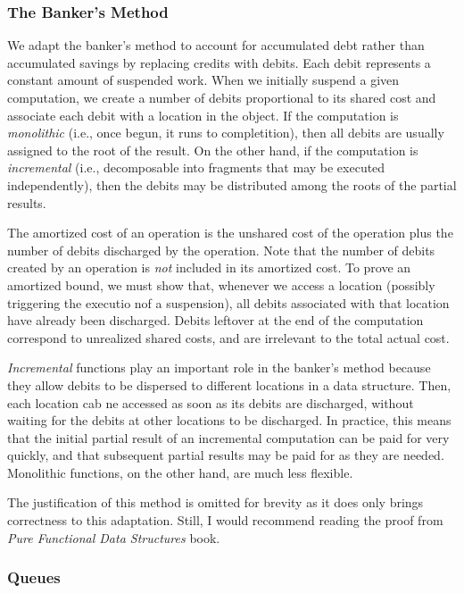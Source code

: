 \documentclass[12pt, a4paper]{article} %
\begin{document}
\subsubsection{The Banker's Method}%
\label{ssub:The Banker's Method}

We adapt the banker's method to account for accumulated debt rather than accumulated savings by replacing credits with debits. Each debit represents a constant amount of suspended work. When we initially suspend a given computation, we create a number of debits proportional to its shared cost and associate each debit with a location in the object. If the computation is \textit{monolithic} (i.e., once begun, it runs to completition), then all debits are usually assigned to the root of the result. On the other hand, if the computation is \textit{incremental} (i.e., decomposable into fragments that may be executed independently), then the debits may be distributed among the roots of the partial results.

The amortized cost of an operation is the unshared cost of the operation plus the number of debits discharged by the operation. Note that the number of debits created by an operation is \textit{not} included in its amortized cost. To prove an amortized bound, we must show that, whenever we access a location (possibly triggering the executio nof a suspension), all debits associated with that location have already been discharged. Debits leftover at the end of the computation correspond to unrealized shared costs, and are irrelevant to the total actual cost.

\textit{Incremental} functions play an important role in the banker's method because they allow debits to be dispersed to different locations in a data structure. Then, each location cab ne accessed as soon as its debits are discharged, without waiting for the debits at other locations to be discharged. In practice, this means that the initial partial result of an incremental computation can be paid for very quickly, and that subsequent partial results may be paid for as they are needed. Monolithic functions, on the other hand, are much less flexible.

The justification of this method is omitted for brevity as it does only brings correctness to this adaptation. Still, I would recommend reading the proof from \textit{Pure Functional Data Structures} book.

\subsubsection{Queues}%
\label{ssub:Queues}
\end{document}
